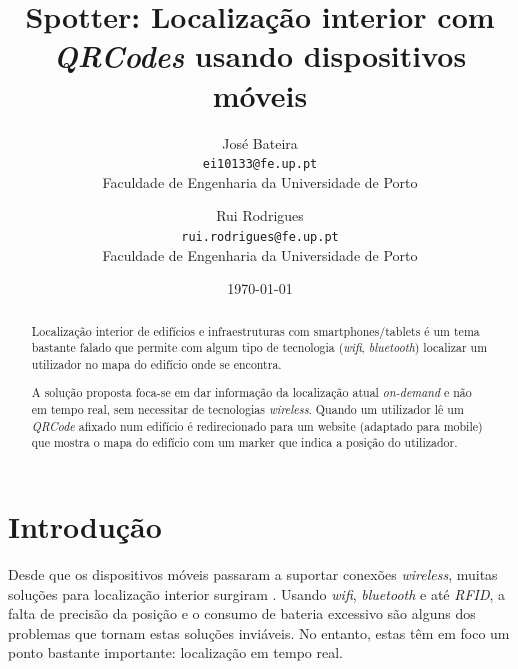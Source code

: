 \documentclass[twocolumn,twoside,11pt]{article}
\title{\vspace{-15mm}\fontsize{24.88pt}{10pt}\textbf{
  Spotter: Localização interior com \emph{QRCodes} usando dispositivos móveis
}}
\author{José Bateira\\
\small \texttt{ei10133@fe.up.pt}\\
\small Faculdade de Engenharia da Universidade de Porto
\and
Rui Rodrigues\\
\small \texttt{rui.rodrigues@fe.up.pt} \\
\small Faculdade de Engenharia da Universidade de Porto
}
\date{\today}
\newcommand{\qrcode}{\emph{QRCode}}
\begin{document}
\maketitle


\begin{abstract}
    Localização interior de edifícios e infraestruturas com smartphones/tablets é um tema bastante falado que permite com algum tipo de tecnologia (\emph{wifi}, \emph{bluetooth}) localizar um utilizador no mapa do edifício onde se encontra.

  A solução proposta foca-se em dar informação da localização atual \emph{on-demand} e não em tempo real, sem necessitar de tecnologias \emph{wireless}.
  Quando um utilizador lê um \qrcode{} afixado num edifício é redirecionado para um website (adaptado para mobile) que mostra o mapa do edifício com um marker que indica a posição do utilizador.

\end{abstract}


\section{Introdução}\label{sec:intro}

  Desde que os dispositivos móveis passaram a suportar conexões \emph{wireless}, muitas soluções para localização interior surgiram \cite{Liu2007} \cite{Koyuncu2010}.
  Usando \emph{wifi}, \emph{bluetooth} e até \emph{RFID}, a falta de precisão da posição e o consumo de bateria excessivo são alguns dos problemas que tornam estas soluções inviáveis.
  No entanto, estas têm em foco um ponto bastante importante: localização em tempo real.
\end{document}
